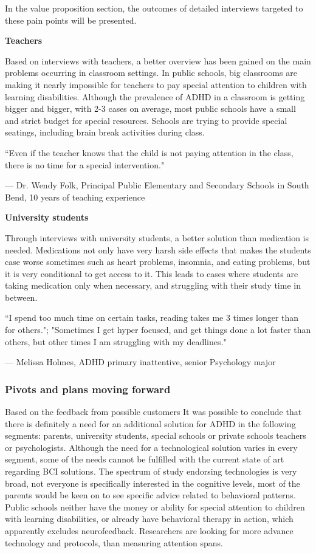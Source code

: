 \documentclass[letterpaper,10pt]{article}
\begin{document}
In the value proposition section, the outcomes of detailed interviews targeted to these pain points will be presented.


\textbf{Teachers}

Based on interviews with teachers, a better overview has been gained on the main problems occurring in classroom settings. In public schools, big classrooms are making it nearly impossible for teachers to pay special attention to children with learning disabilities. Although the prevalence of ADHD in a classroom is getting bigger and bigger, with 2-3 cases on average, most public schools have a small and strict budget for special resources. Schools are trying to provide special seatings, including brain break activities during class.

\textcolor{myblue}{\epigraph{``Even if the teacher knows that the child is not paying attention in the class, there is no time for a special intervention."}{--- \textup{Dr. Wendy Folk}, Principal Public Elementary and Secondary Schools in South Bend, 10 years of teaching experience }}

\textbf{University students}

Through interviews with university students, a better solution than medication is needed. Medications not only have very harsh side effects that makes the students case worse sometimes such as heart problems, insomnia, and eating problems, but it is very conditional to get access to it. This leads to cases where students are taking medication only when necessary, and struggling with their study time in between. 


\textcolor{myblue}{\epigraph{``I spend too much time on certain tasks, reading takes me 3 times longer than for others."; "Sometimes I get hyper focused, and get things done a lot faster than others, but other times I am struggling with my deadlines."}{--- \textup{Melissa Holmes}, ADHD primary inattentive, senior Psychology major}}


\subsubsection{Pivots and plans moving forward}

Based on the feedback from possible customers It was possible to conclude that there is definitely a need for an additional solution for ADHD in the following segments: parents, university students, special schools or private schools teachers or psychologists. Although the need for a technological solution varies in every segment, some of the needs cannot be fulfilled with the current state of art regarding BCI solutions. The spectrum of study endorsing technologies is very broad, not everyone is specifically interested in the cognitive levels, most of the parents would be keen on to see specific advice related to behavioral patterns. Public schools neither have the money or ability for special attention to children with learning disabilities, or already have behavioral therapy in action, which apparently excludes neurofeedback. Researchers are looking for more advance technology and protocols, than measuring attention spans. 
\end{document}
